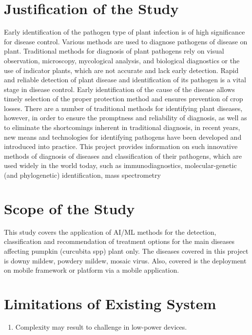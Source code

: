 {\section {Justification of the Study}
Early identification of the pathogen type of plant infection
	is of high significance for disease control. Various methods are used
	to diagnose pathogens of disease on plant. Traditional methods for
	diagnosis of plant pathogens rely on visual observation, microscopy,
	mycological analysis, and biological diagnostics or the use of indicator
	plants, which are not accurate and lack early detection. Rapid and
	reliable detection of plant disease and identification of its pathogen
	is a vital stage in disease control. Early identification of the cause
	of the disease allows timely selection of the proper protection method
	and ensures prevention of crop losses. There are a number of traditional
	methods for identifying plant diseases, however, in order to ensure
	the promptness and reliability of diagnosis, as well as to eliminate
	the shortcomings inherent in traditional diagnosis, in recent years,
	new means and technologies for identifying pathogens have been developed
	and introduced into practice. This project provides information on
	such innovative methods of diagnosis of diseases and classification
	of their pathogens, which are used widely in the world today, such
	as immunodiagnostics, molecular-genetic (and phylogenetic) identification,
	mass spectrometry  \citep{khakimovTraditionalCurrentprospectiveMethods2022a}

\section {Scope of the Study}
\label{scope}
This study covers the application of AI/ML methods for the
	detection, classification and recommendation of treatment options
	for the main diseases affecting pumpkin (curcubita spp) plant only.
	The diseases covered in this project is downy mildew, powdery mildew,
	mosaic virus. Also, covered is the deployment on mobile framework or platform via a mobile application.

\section{Limitations of Existing System}
\begin{enumerate}
	\item Complexity may result to challenge in low-power devices.
	

\end{enumerate}}
